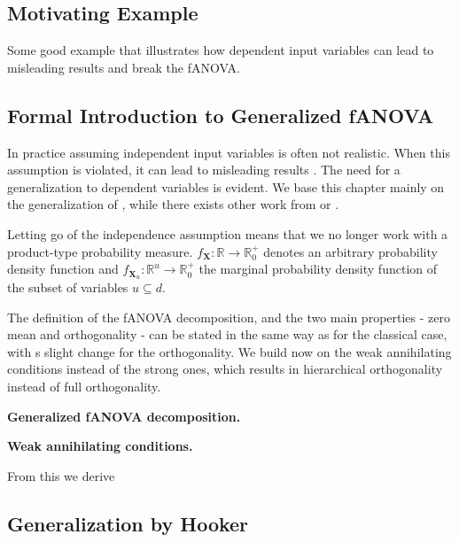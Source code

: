\subsection{Motivating Example}
Some good example that illustrates how dependent input variables can lead to misleading results and break the fANOVA.
\subsection{Formal Introduction to Generalized fANOVA}
In practice assuming independent input variables is often not realistic. When this assumption is violated, it can lead to misleading results \citep{hooker2007}. The need for a generalization to dependent variables is evident. We base this chapter mainly on the generalization of \cite{rahman2014}, while there exists other work from \cite{hooker2007} or \cite{chastaing2012}.\par

Letting go of the independence assumption means that we no longer work with a product-type probability measure. $f_{\boldsymbol{X}}: \mathbb{R} \rightarrow \mathbb{R}_{0}^{+}$ denotes an arbitrary probability density function and $f_{\boldsymbol{X}_u}: \mathbb{R}^u \rightarrow \mathbb{R}_{0}^{+}$ the marginal probability density function of the subset of variables $u \subseteq d$.\par

The definition of the fANOVA decomposition, and the two main properties - zero mean and orthogonality - can be stated in the same way as for the classical case, with s slight change for the orthogonality. We build now on the weak annihilating conditions instead of the strong ones, which results in hierarchical orthogonality instead of full orthogonality.\par

\begin{definition}
    \textbf{Generalized fANOVA decomposition.}
\end{definition}

\textbf{Weak annihilating conditions.}

From this we derive

\begin{proposition}
\end{proposition}

\begin{proposition}
\end{proposition}


\subsection{Generalization by Hooker}



